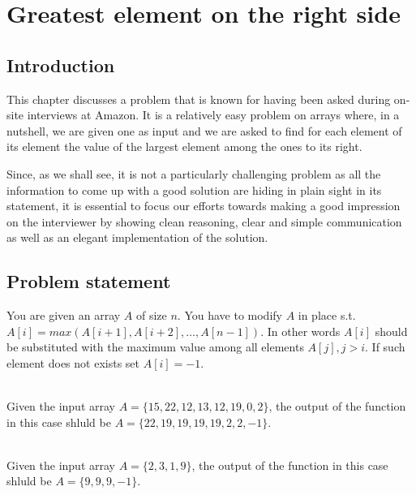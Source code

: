 %


\chapter{Greatest element on the right side}
\label{ch:greatest_right}
\section*{Introduction}
This chapter discusses a problem that is known for having been asked during on-site interviews at Amazon. 
It is a relatively easy problem on arrays where, in a nutshell, we are given one as input and we are asked to find for each element of its element the value of the largest element among the ones to its right. 

Since, as we shall see, it is not a particularly challenging problem as all the information to come up with a good solution are hiding in plain sight in its statement, it is essential to focus our efforts towards making a good impression on the interviewer by showing clean reasoning, clear and simple communication as well as an elegant implementation of the solution.



\section{Problem statement}
\begin{exercise}
You are given an array $A$ of size $n$. You have to modify $A$ in place s.t. $A[i] = max(A[i+1], A[i+2],\ldots, A[n-1])$. In other words $A[i]$ should be substituted with  the maximum value among all elements $A[j], j > i$. If such element does not exists set $A[i] = -1$.

	\begin{example}
		\hfill \\
		Given the input array $A = \{15, 22, 12, 13, 12, 19, 0, 2\}$, the output of the function in this case shluld be  $A = \{22, 19, 19, 19, 19, 2, 2, -1\}$.
	\end{example}

	\begin{example}
		\hfill \\
		Given the input array $A = \{2, 3, 1, 9\}$, the output of the function in this case shluld be  $A = \{9, 9, 9, -1\}$.
	\end{example}

\end{exercise}


